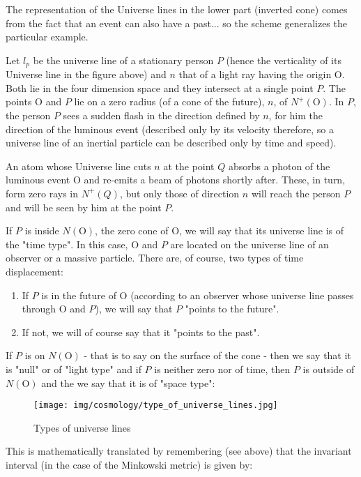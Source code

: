 	\begin{tcolorbox}[title=Remark,colframe=black,arc=10pt]
	The representation of the Universe lines in the lower part (inverted cone) comes from the fact that an event can also have a past... so the scheme generalizes the particular example.
	\end{tcolorbox}	
	Let $l_p$ be the universe line of a stationary person $P$ (hence the verticality of its Universe line in the figure above) and $n$ that of a light ray having the origin O. Both lie in the four dimension space and they intersect at a single point $P$. The points O and $P$ lie on a zero radius (of a cone of the future), $n$, of $N^{+}(\text{O})$. In $P$, the person $P$ sees a sudden flash in the direction defined by $n$, for him the direction of the luminous event (described only by its velocity therefore, so a universe line of an inertial particle can be described only by time and speed).
	
	An atom whose Universe line cuts $n$ at the point $Q$ absorbs a photon of the luminous event O and re-emits a beam of photons shortly after. These, in turn, form zero rays in $N^{+}(Q)$, but only those of direction $n$ will reach the person $P$ and will be seen by him at the point $P$.

	If $P$ is inside $N(\text{O})$, the zero cone of O, we will say that its universe line is of the "time type". In this case, O and $P$ are located on the universe line of an observer or a massive particle. There are, of course, two types of time displacement:
	\begin{enumerate}
		\item If $P$ is in the future of O (according to an observer whose universe line passes through O and $P$), we will say that $P$ "points to the future".

		\item If not, we will of course say that it "points to the past".
	\end{enumerate}
	If $P$ is on $N(\text{O})$ - that is to say on the surface of the cone - then we say that it is "null" or of "light type" and if $P$ is neither zero nor of time, then $P$ is outside of $N(\text{O})$ and the we say that it is of "space type":
	\begin{figure}[H]
		\centering
		\texttt{[image: img/cosmology/type\_of\_universe\_lines.jpg]}
		\caption{Types of universe lines}	
	\end{figure}
	This is mathematically translated by remembering (see above) that the invariant interval (in the case of the Minkowski metric) is given by:
	

